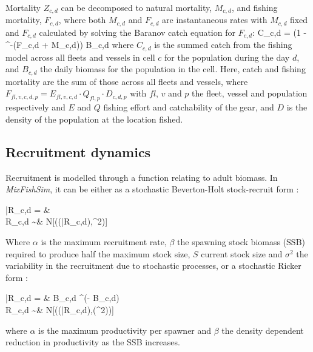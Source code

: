 \documentclass[review]{elsarticle}
\let\oldequation\equation
\let\oldendequation\endequation
\renewenvironment{equation}
 {\linenomathNonumbers\oldequation}
 {\oldendequation\endlinenomath}
\begin{document}
Mortality $Z_{c,d}$ can be decomposed to natural mortality, $M_{c,d}$, and
fishing mortality, $F_{c,d}$, where both $M_{c,d}$ and $F_{c,d}$ are
instantaneous rates with $M_{c,d}$ fixed and $F_{c,d}$ calculated by solving
the Baranov catch equation \citep{Hilborn1992b} for $F_{c,d}$:
\begin{equation}
C_{c,d} =  \cdot \left(1 -
	^{-(F_{c,d} + M_{c,d})}\right) \cdot B_{c,d}
\end{equation}
where $C_{c,d}$ is the summed catch from the fishing model across all fleets
and vessels in cell $c$ for the population during the day $d$, and $B_{c,d}$
the daily biomass for the population in the cell. Here, catch and fishing
mortality are the sum of those across all fleets and vessels, where $F_{fl, v,
	c, d, p} = E_{fl, v, c, d} \cdot Q_{fl, p} \cdot D_{c, d, p}$ with
$fl$, $v$ and $p$ the fleet, vessel and population respectively and $E$ and $Q$
fishing effort and catchability of the gear, and $D$ is the density of the
population at the location fished. \\

\subsection{Recruitment dynamics}

Recruitment is modelled through a function relating to adult biomass. In
\textit{MixFishSim}, it can be either as a stochastic Beverton-Holt stock-recruit
form \citep{Beverton1957}: 
\begin{equation}
	\begin{split}
	\bar{R}_{c,d} = &  \\
	     R_{c,d} \sim & \log N[(\log(\bar{R}_{c,d}),\sigma^2)]
	\end{split}
\end{equation}
Where $\alpha$ is the maximum recruitment rate, $\beta$ the spawning stock
biomass (SSB) required to produce half the maximum stock size, $S$ current
stock size and $\sigma^2$ the variability in the recruitment due to stochastic
processes, or a stochastic Ricker form \citep{Ricker1954}:
\begin{equation}
	\begin{split}
	\bar{R}_{c,d} = & B_{c,d} \cdot {}^{(\alpha - \beta \cdot B_{c,d})} \\	
   	     R_{c,d} \sim & \log N[(\log(\bar{R}_{c,d}),\log(\sigma^2))]
	\end{split}
\end{equation}
where $\alpha$ is the maximum productivity per spawner and $\beta$ the density
dependent reduction in productivity as the SSB increases. 
\end{document}

